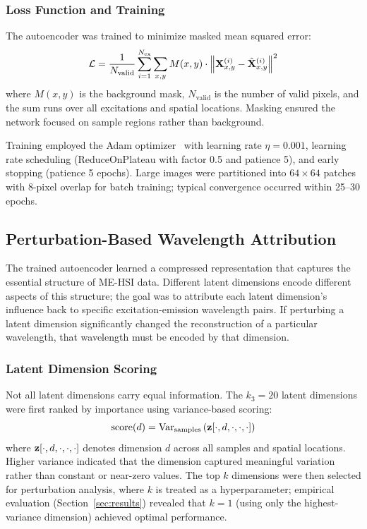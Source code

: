 \subsubsection{Loss Function and Training}
The autoencoder was trained to minimize masked mean squared error:
\begin{equation}
\mathcal{L} = \frac{1}{N_{\text{valid}}} \sum_{i=1}^{N_{\text{ex}}} \sum_{x,y} M(x,y) \cdot \left\| \mathbf{X}^{(i)}_{x,y} - \hat{\mathbf{X}}^{(i)}_{x,y} \right\|^2
\label{eq:loss}
\end{equation}
where $M(x,y)$ is the background mask, $N_{\text{valid}}$ is the number of valid pixels, and the sum runs over all excitations and spatial locations.
Masking ensured the network focused on sample regions rather than background.

Training employed the Adam optimizer~\cite{kingma2014adam} with learning rate $\eta = 0.001$, learning rate scheduling (ReduceOnPlateau with factor 0.5 and patience 5), and early stopping (patience 5 epochs).
Large images were partitioned into $64 \times 64$ patches with 8-pixel overlap for batch training; typical convergence occurred within 25--30 epochs.

\subsection{Perturbation-Based Wavelength Attribution}
\label{sec:perturbation}

The trained autoencoder learned a compressed representation that captures the essential structure of ME-HSI data.
Different latent dimensions encode different aspects of this structure; the goal was to attribute each latent dimension's influence back to specific excitation-emission wavelength pairs.
If perturbing a latent dimension significantly changed the reconstruction of a particular wavelength, that wavelength must be encoded by that dimension.

\subsubsection{Latent Dimension Scoring}
Not all latent dimensions carry equal information.
The $k_3 = 20$ latent dimensions were first ranked by importance using variance-based scoring:
\begin{equation}
\text{score}(d) = \text{Var}_{\text{samples}}\left(\mathbf{z}[\cdot, d, \cdot, \cdot, \cdot]\right)
\label{eq:dim_score}
\end{equation}
where $\mathbf{z}[\cdot, d, \cdot, \cdot, \cdot]$ denotes dimension $d$ across all samples and spatial locations.
Higher variance indicated that the dimension captured meaningful variation rather than constant or near-zero values.
The top $k$ dimensions were then selected for perturbation analysis, where $k$ is treated as a hyperparameter; empirical evaluation (Section~\ref{sec:results}) revealed that $k=1$ (using only the highest-variance dimension) achieved optimal performance.

